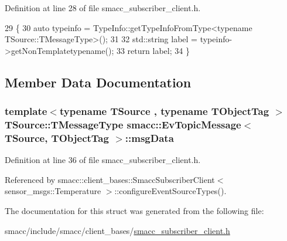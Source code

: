 Definition at line 28 of file smacc\+\_\+subscriber\+\_\+client.\+h.


\begin{DoxyCode}
29   \{
30     \textcolor{keyword}{auto} typeinfo = TypeInfo::getTypeInfoFromType<typename TSource::TMessageType>();
31 
32     std::string label = typeinfo->getNonTemplatetypename();
33     \textcolor{keywordflow}{return} label;
34   \}
\end{DoxyCode}


\subsection{Member Data Documentation}
\subsubsection[{\texorpdfstring{msg\+Data}{msgData}}]{\setlength{\rightskip}{0pt plus 5cm}template$<$typename T\+Source , typename T\+Object\+Tag $>$ T\+Source\+::\+T\+Message\+Type {\bf smacc\+::\+Ev\+Topic\+Message}$<$ T\+Source, T\+Object\+Tag $>$\+::msg\+Data}\hypertarget{structsmacc_1_1EvTopicMessage_adc167f5114cc3c4ff06ea9c810cc280f}{}\label{structsmacc_1_1EvTopicMessage_adc167f5114cc3c4ff06ea9c810cc280f}


Definition at line 36 of file smacc\+\_\+subscriber\+\_\+client.\+h.



Referenced by smacc\+::client\+\_\+bases\+::\+Smacc\+Subscriber\+Client$<$ sensor\+\_\+msgs\+::\+Temperature $>$\+::configure\+Event\+Source\+Types().



The documentation for this struct was generated from the following file\+:\begin{DoxyCompactItemize}
\item 
smacc/include/smacc/client\+\_\+bases/\hyperlink{smacc__subscriber__client_8h}{smacc\+\_\+subscriber\+\_\+client.\+h}\end{DoxyCompactItemize}
